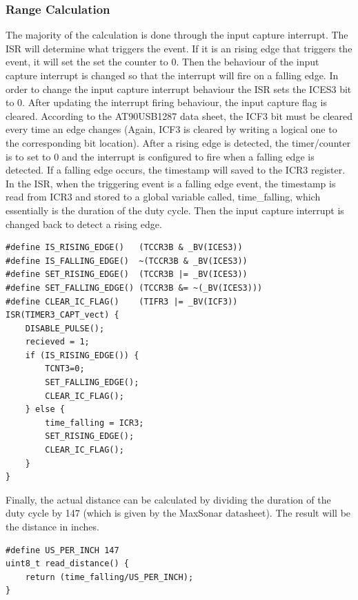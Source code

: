 \subsubsection{Range Calculation}
The majority of the calculation is done through the input capture interrupt. The ISR will determine what triggers the event. If it is an rising edge that triggers the event, it will set the set the counter to 0. Then the behaviour of the input capture interrupt is changed so that the interrupt will fire on a falling edge. In order to change the input capture interrupt behaviour the ISR sets the ICES3 bit to 0. After updating the interrupt firing behaviour, the input capture flag is cleared. According to the AT90USB1287 data sheet, the ICF3 bit must be cleared every time an edge changes (Again, ICF3 is cleared by writing a logical one to the corresponding bit location). After a rising edge is detected, the timer/counter is to set to 0 and the interrupt is configured to fire when a falling edge is detected. If a falling edge occurs, the timestamp will saved to the ICR3 register. In the ISR, when the triggering event is a falling edge event, the timestamp is read from ICR3 and stored to a global variable called, time\_falling, which essentially is the duration of the duty cycle. Then the input capture interrupt is changed back to detect a rising edge.

\begin{lstlisting}
#define IS_RISING_EDGE()   (TCCR3B & _BV(ICES3))
#define IS_FALLING_EDGE()  ~(TCCR3B & _BV(ICES3))
#define SET_RISING_EDGE()  (TCCR3B |= _BV(ICES3))                          
#define SET_FALLING_EDGE() (TCCR3B &= ~(_BV(ICES3)))                       
#define CLEAR_IC_FLAG()    (TIFR3 |= _BV(ICF3))
ISR(TIMER3_CAPT_vect) {
	DISABLE_PULSE();                                        
	recieved = 1;
	if (IS_RISING_EDGE()) {
		TCNT3=0;
		SET_FALLING_EDGE();
		CLEAR_IC_FLAG();
	} else {
		time_falling = ICR3;                    
		SET_RISING_EDGE();
		CLEAR_IC_FLAG();
	}	
}
\end{lstlisting}

Finally, the actual distance can be calculated by dividing the duration of the duty cycle by 147 (which is given by the MaxSonar datasheet). The result will be the distance in inches.

\begin{lstlisting}
#define US_PER_INCH 147
uint8_t read_distance() {
	return (time_falling/US_PER_INCH);      
}
\end{lstlisting}

